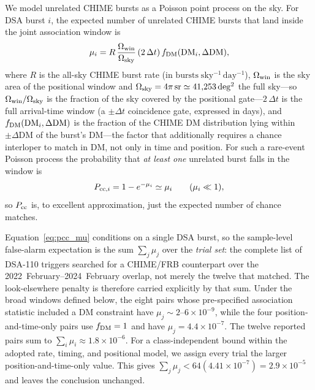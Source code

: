 We model unrelated CHIME bursts as a Poisson point process on the sky. For DSA
burst $i$, the expected number of unrelated CHIME bursts that land inside the joint
association window is
\begin{equation}
\mu_i = R \,\frac{\Omega_{\rm win}}{\Omega_{\rm sky}}\, (2\,\Delta t)\, f_{\rm DM}(\mathrm{DM}_i,\Delta\mathrm{DM}),
\label{eq:pcc_mu}
\end{equation}
where $R$ is the all-sky CHIME burst rate (in
$\mathrm{bursts\;sky^{-1}\,day^{-1}}$),
$\Omega_{\rm win}$ is the sky area of the positional window and
$\Omega_{\rm sky} = 4\pi\,\mathrm{sr} \simeq 41{,}253\,\mathrm{deg^2}$ the full
sky---so $\Omega_{\rm win}/\Omega_{\rm sky}$ is the fraction of the sky covered
by the positional gate---$2\,\Delta t$ is the
full arrival-time window (a $\pm\Delta t$ coincidence gate, expressed in days), and
$f_{\rm DM}(\mathrm{DM}_i,\Delta\mathrm{DM})$ is the fraction of the CHIME DM
distribution lying within $\pm\Delta\mathrm{DM}$ of the burst's DM---the factor
that additionally requires a chance interloper to match in DM, not only in
time and position. For such a rare-event Poisson process the probability that
\emph{at least one} unrelated burst falls in the window is
\begin{equation}
P_{{\rm cc},i} = 1 - e^{-\mu_i} \simeq \mu_i \qquad (\mu_i \ll 1),
\label{eq:pcc_p}
\end{equation}
so $P_{\rm cc}$ is, to excellent approximation, just the expected number of chance
matches.

Equation~\eqref{eq:pcc_mu} conditions on a single DSA burst, so the sample-level
false-alarm expectation is the sum $\sum_j \mu_j$ over the \emph{trial set}: the
complete list of DSA-110 triggers searched for a CHIME/FRB counterpart over the
2022~February--2024~February overlap, not merely the twelve that matched. The
look-elsewhere penalty is therefore carried explicitly by that sum. Under the
broad windows defined below, the eight pairs whose pre-specified
association statistic included a DM constraint have
$\mu_j\sim2$--$6\times10^{-9}$, while the four position-and-time-only pairs use
$f_{\rm DM}=1$ and have $\mu_j=4.4\times10^{-7}$. The twelve reported pairs sum
to $\sum_i\mu_i\approx1.8\times10^{-6}$. For a class-independent bound within
the adopted rate, timing, and positional model, we assign every trial the larger
position-and-time-only value. This gives
$\sum_j\mu_j < 64(4.41\times10^{-7})=2.9\times10^{-5}$ and leaves the
conclusion unchanged.

